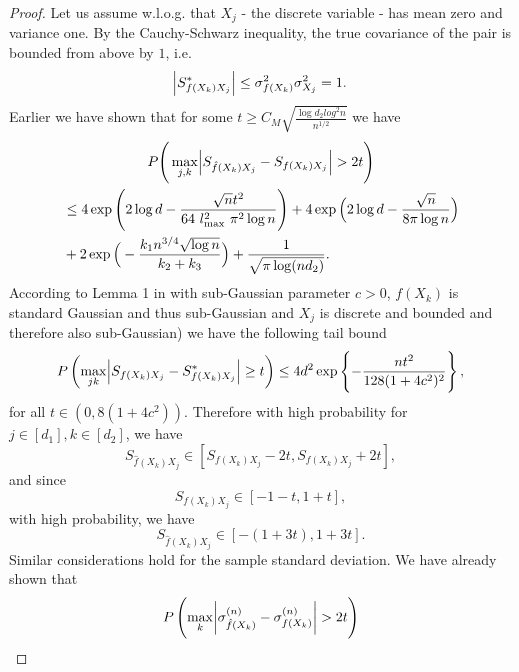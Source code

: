 \begin{proof}
    Let us assume w.l.o.g. that $X_j$ - the discrete variable - has mean zero and variance one. By the Cauchy-Schwarz inequality, the true covariance of the pair is bounded from above by $1$, i.e.
    \begin{equation*}
        \abs{S^*_{f(X_k)X_j}} \leq \sigma^{2}_{f(X_k)} \sigma^{2}_{X_j} = 1.
    \end{equation*}
    Earlier we have shown that for some $t \geq C_M\sqrt{\frac{\log d_2 log^2 n}{n^{1/2}}}$ we have
    \begin{multline}
        P\Bigg(\max_{j,k} \abs{S_{\hat{f}(X_k)X_j} - S_{f(X_k)X_j}} > 2t \Bigg) \\
        \begin{aligned}
             & \leq 4\exp\Bigg(2\log d - \frac{\sqrt{n}t^2}{64 \ l_{\max}^2 \ \pi^2 \log n}\Bigg) + 4\exp\Big(2\log d - \frac{\sqrt{n}}{8\pi\log n}\Big) \\
             & + 2\exp\Big(- \frac{k_1 n^{3/4} \sqrt{\log n}}{k_2+ k_3} \Big) + \frac{1}{\sqrt{\pi \log(nd_2)}}.
        \end{aligned}
    \end{multline}
    According to Lemma 1 in \cite{Ravikumar11} with sub-Gaussian parameter $c > 0$, $f(X_k)$ is standard Gaussian and thus sub-Gaussian and $X_j$ is discrete and bounded and therefore also sub-Gaussian) we have the following tail bound
    \begin{equation*}
        P\left(\max_{jk}\abs{S_{{f}(X_k)X_j} - S^*_{{f}(X_k)X_j}} \geq t \right) \leq 4d^2 \exp\left\{- \frac{nt^2}{128(1+4c^2)^2} \right\},
    \end{equation*}
    for all $t \in (0,8(1+4c^2))$.
    Therefore with high probability for \(j \in [d_1], k \in [d_2]\), we have
    \begin{equation*}
        S_{\hat{f}(X_k)X_j} \in [S_{{f}(X_k)X_j} - 2t , S_{{f}(X_k)X_j} + 2t],
    \end{equation*}
    and since
    \begin{equation*}
        S_{{f}(X_k)X_j} \in [-1 - t , 1 + t],
    \end{equation*}
    with high probability, we have
    \begin{equation*}
        S_{\hat{f}(X_k)X_j} \in [-(1 + 3t), 1 + 3t].
    \end{equation*}
    Similar considerations hold for the sample standard deviation. We have already shown that
    \begin{multline*}
        P\left(\max_k \abs{\sigma^{(n)}_{\hat{f}(X_k)} - \sigma^{(n)}_{f(X_k)}} > 2t \right) \\

\end{multline*}
\end{proof}
